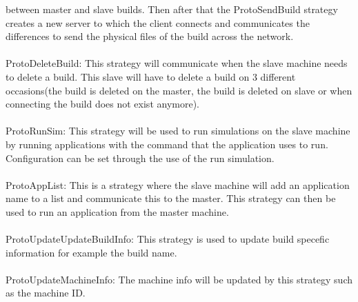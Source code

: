 \documentclass[a4paper,12pt,final]{article}
\begin{document}
between master and slave builds. Then after that the ProtoSendBuild strategy creates a new server to which the client connects
and communicates the differences to send the physical files of the build across the network.
\\
\textbf{\\}
ProtoDeleteBuild: This strategy will communicate when the slave machine needs to delete a build. This slave will have to delete a build
on 3 different occasions(the build is deleted on the master, the build is deleted on slave or when connecting the build does not exist anymore).
\\
\textbf{\\}
ProtoRunSim: This strategy will be used to run simulations on the slave machine by running
applications with the command that the application uses to run. Configuration can be set through the use of the run simulation.
\\
\textbf{\\}
ProtoAppList: This is a strategy where the slave machine will add an application name to a list and communicate this to the master. This 
strategy can then be used to run an application from the master machine.
\\
\textbf{\\}
ProtoUpdateUpdateBuildInfo: This strategy is used to update build specefic information for example the build name.
\\
\textbf{\\}
ProtoUpdateMachineInfo: The machine info will be updated by this strategy such as the machine ID.
\end{document}
